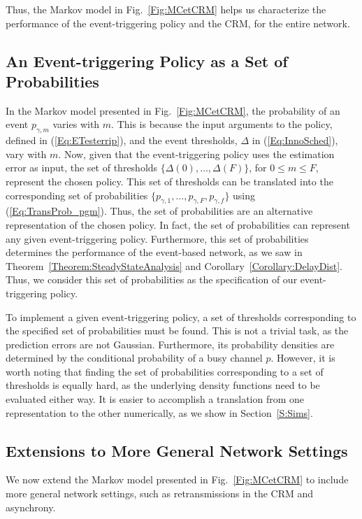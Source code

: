 \documentclass[journal]{IEEEtran}
\begin{document}
Thus, the Markov model in Fig.~\ref{Fig:MCetCRM} helps us characterize the performance of the event-triggering policy and the CRM, for the entire network.

\subsection{An Event-triggering Policy as a Set of Probabilities}

In the Markov model presented in Fig.~\ref{Fig:MCetCRM}, the probability of an event $p_{\gamma,m}$ varies with $m$. This is because the input arguments to the policy, defined in (\ref{Eq:ETesterrip}), and the event thresholds, $\Delta$ in (\ref{Eq:InnoSched}), vary with $m$. Now, given that the event-triggering policy uses the estimation error as input, the set of thresholds $\{\Delta(0),\dots,\Delta(F)\}$, for $0 \le m \le F$, represent the chosen policy. This set of thresholds can be translated into the corresponding set of probabilities $\{p_{\gamma,1},\dots,p_{\gamma,F},p_{\gamma,f}\}$ using (\ref{Eq:TransProb_pgm}). Thus, the set of probabilities are an alternative representation of the chosen policy. In fact, the set of probabilities can represent any given event-triggering policy. Furthermore, this set of probabilities determines the performance of the event-based network, as we saw in Theorem~\ref{Theorem:SteadyStateAnalysis} and Corollary~\ref{Corollary:DelayDist}. Thus, we consider this set of probabilities as the specification of our event-triggering policy.

To implement a given event-triggering policy, a set of thresholds corresponding to the specified set of probabilities must be found. This is not a trivial task, as the prediction errors are not Gaussian. Furthermore, its probability densities are determined by the conditional probability of a busy channel $p$. However, it is worth noting that finding the set of probabilities corresponding to a set of thresholds is equally hard, as the underlying density functions need to be evaluated either way. It is easier to accomplish a translation from one representation to the other numerically, as we show in Section~\ref{S:Sims}.

\subsection{Extensions to More General Network Settings} \label{S:Extn}

We now extend the Markov model presented in Fig.~\ref{Fig:MCetCRM} to include more general network settings, such as retransmissions in the CRM and asynchrony. 
\end{document}
